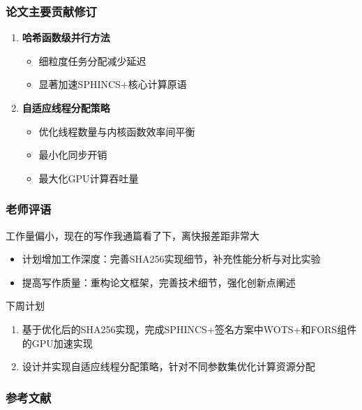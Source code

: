 \documentclass[slide]{../../custom}
\begin{document}
\begin{frame}
  \frametitle{论文主要贡献修订}
  \begin{enumerate}
    \item \textbf{哈希函数级并行方法}
      \begin{itemize}
        \item 细粒度任务分配减少延迟
        \item 显著加速SPHINCS+核心计算原语
      \end{itemize}

    \item \textbf{自适应线程分配策略}
      \begin{itemize}
        \item 优化线程数量与内核函数效率间平衡
        \item 最小化同步开销
        \item 最大化GPU计算吞吐量
      \end{itemize}
  \end{enumerate}
\end{frame}

\begin{frame}
  \frametitle{老师评语}
  \begin{alertblock}{工作量偏小，现在的写作我通篇看了下，离快报差距非常大}
    \begin{itemize}
      \item 计划增加工作深度：完善SHA256实现细节，补充性能分析与对比实验
      \item 提高写作质量：重构论文框架，完善技术细节，强化创新点阐述
    \end{itemize}
  \end{alertblock}
  \begin{block}{下周计划}
    \begin{enumerate}
      \item 基于优化后的SHA256实现，完成SPHINCS+签名方案中WOTS+和FORS组件的GPU加速实现
      \item 设计并实现自适应线程分配策略，针对不同参数集优化计算资源分配
    \end{enumerate}
  \end{block}
\end{frame}

\begin{frame}
  \frametitle{参考文献}
  
  
\end{frame}
\end{document}
